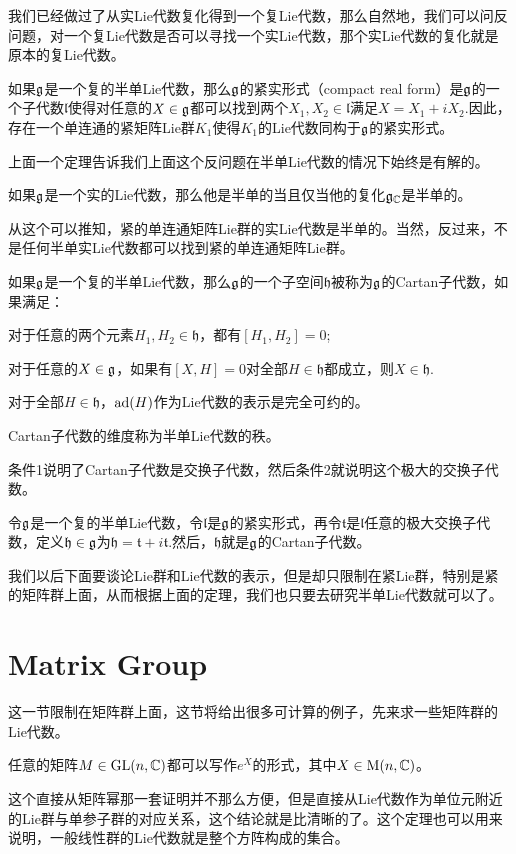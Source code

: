 我们已经做过了从实Lie代数复化得到一个复Lie代数，那么自然地，我们可以问反问题，对一个复Lie代数是否可以寻找一个实Lie代数，那个实Lie代数的复化就是原本的复Lie代数。

\para 如果${\mathfrak{g}}$是一个复的半单Lie代数，那么${\mathfrak{g}}$的紧实形式（compact real form）是${\mathfrak{g}}$的一个子代数$\mathfrak{l}$使得对任意的$X\in{\mathfrak{g}}$都可以找到两个$X_1,X_2\in\mathfrak{l}$满足$X=X_1+iX_2$.因此，存在一个单连通的紧矩阵Lie群$K_1$使得$K_1$的Lie代数同构于${\mathfrak{g}}$的紧实形式。

上面一个定理告诉我们上面这个反问题在半单Lie代数的情况下始终是有解的。

\pro 如果${\mathfrak{g}}$是一个实的Lie代数，那么他是半单的当且仅当他的复化${\mathfrak{g}}_{\mathbb{C}}$是半单的。

从这个可以推知，紧的单连通矩阵Lie群的实Lie代数是半单的。当然，反过来，不是任何半单实Lie代数都可以找到紧的单连通矩阵Lie群。

\para 如果${\mathfrak{g}}$是一个复的半单Lie代数，那么${\mathfrak{g}}$的一个子空间$\mathfrak{h}$被称为${\mathfrak{g}}$的Cartan子代数，如果满足：

 对于任意的两个元素$H_1,H_2\in\mathfrak{h}$，都有$[H_1,H_2]=0$;

 对于任意的$X\in {\mathfrak{g}}$，如果有$[X,H]=0$对全部$H\in\mathfrak{h}$都成立，则$X\in \mathfrak{h}$.

 对于全部$H\in \mathfrak{h}$，$\operatorname{ad}(H)$作为Lie代数的表示是完全可约的。

Cartan子代数的维度称为半单Lie代数的秩。

条件1说明了Cartan子代数是交换子代数，然后条件2就说明这个极大的交换子代数。

\pro 令${\mathfrak{g}}$是一个复的半单Lie代数，令$\mathfrak{l}$是${\mathfrak{g}}$的紧实形式，再令$\mathfrak{t}$是$\mathfrak{l}$任意的极大交换子代数，定义$\mathfrak{h}\in{\mathfrak{g}}$为$\mathfrak{h}=\mathfrak{t}+i\mathfrak{t}$.然后，$\mathfrak{h}$就是${\mathfrak{g}}$的Cartan子代数。

我们以后下面要谈论Lie群和Lie代数的表示，但是却只限制在紧Lie群，特别是紧的矩阵群上面，从而根据上面的定理，我们也只要去研究半单Lie代数就可以了。

\section{Matrix Group}
这一节限制在矩阵群上面，这节将给出很多可计算的例子，先来求一些矩阵群的Lie代数。

\theo 任意的矩阵$M\in\mathrm{GL}(n,\mathbb{C})$都可以写作$e^X$的形式，其中$X\in\mathrm{M}(n,\mathbb{C})$。

这个直接从矩阵幂那一套证明并不那么方便，但是直接从Lie代数作为单位元附近的Lie群与单参子群的对应关系，这个结论就是比清晰的了。这个定理也可以用来说明，一般线性群的Lie代数就是整个方阵构成的集合。

